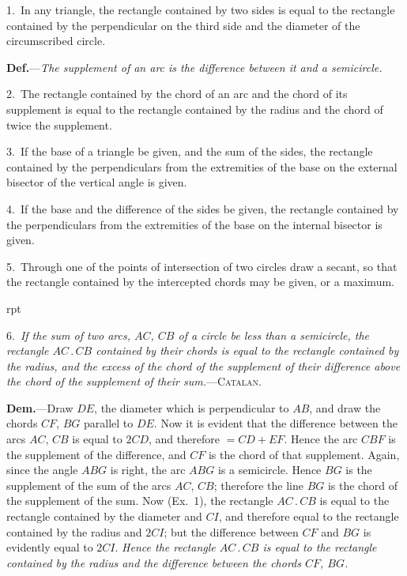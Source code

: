 \documentclass[oneside]{book}
\newcounter{wrapwidth}
\newcommand\imgflow[3]{
\setcounter{wrapwidth}{#1}

\begin{wrapfigure}[#2]{r}{\value{wrapwidth}pt}
\begin{center}
\vspace{-0.3in}

\end{center}
\end{wrapfigure}
}
\begin{document}
\begin{footnotesize}
1.~In any triangle, the rectangle contained by two sides is
equal to the rectangle contained by the perpendicular on the third
side and the diameter of the circumscribed circle.

\textbf{Def.}---\emph{The supplement of an arc is the difference between it and
a semicircle.}


2.~The rectangle contained by the chord of an arc and the
chord of its supplement is equal to the rectangle contained by
the radius and the chord of twice the supplement.

3.~If the base of a triangle be given, and the sum of the sides,
the rectangle contained by the perpendiculars from the extremities
of the base on the external bisector of the vertical angle is given.

4.~If the base and the difference of the sides be given, the
rectangle contained by the perpendiculars from the extremities
of the base on the internal bisector is given.

5.~Through one of the points of intersection of two circles
draw a secant, so that the rectangle contained by the intercepted
chords may be given, or a maximum.


\imgflow{135}{16}{f147}

6.~\emph{If the sum of two arcs, $AC$, $CB$ of a circle be less than a
semicircle, the rectangle $AC\,.\,CB$
contained by their chords is equal
to the rectangle contained by the
radius, and the excess of the chord
of the supplement of their difference
above the chord of the supplement of
their sum.}---\textsc{Catalan.}

\textbf{Dem.}---Draw $DE$, the diameter
which is perpendicular to $AB$, and
draw the chords $CF$, $BG$ parallel
to $DE$. Now it is evident that the
difference between the arcs $AC$, $CB$
is equal to $2 CD$, and therefore
$= CD + EF$. Hence the arc $CBF$
is the supplement of the difference, and $CF$ is the chord of that
supplement. Again, since the angle $ABG$ is right, the arc $ABG$
is a semicircle. Hence $BG$ is the supplement of the sum of the
arcs $AC$, $CB$; therefore the line $BG$ is the chord of the supplement
of the sum. Now (Ex.~1), the rectangle $AC\,.\,CB$ is equal
to the rectangle contained by the diameter and $CI$, and therefore
equal to the rectangle contained by the radius and $2 CI$; but the
difference between $CF$ and $BG$ is evidently equal to $2 CI$. \emph{Hence
the rectangle $AC\,.\,CB$ is equal to the rectangle contained by the
radius and the difference between the chords $CF$, $BG$.}


\end{footnotesize}
\end{document}
